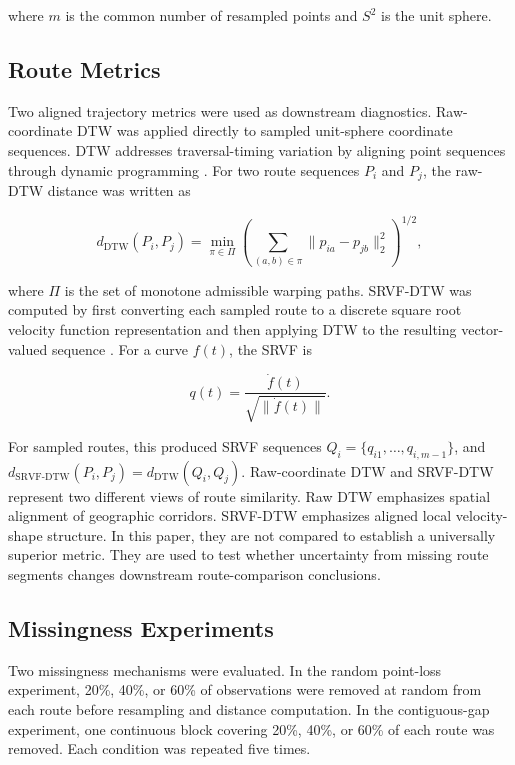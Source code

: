 where \(m\) is the common number of resampled points and \(S^2\) is the unit sphere.

\subsection{Route Metrics}\label{route-metrics}

Two aligned trajectory metrics were used as downstream diagnostics. Raw-coordinate DTW was applied directly to sampled unit-sphere coordinate sequences. DTW addresses traversal-timing variation by aligning point sequences through dynamic programming \citep{sakoe1978}. For two route sequences \(P_i\) and \(P_j\), the raw-DTW distance was written as

\[
d_{\mathrm{DTW}}(P_i,P_j)
= \min_{\pi \in \Pi}
\left(\sum_{(a,b)\in \pi} \lVert p_{ia}-p_{jb}\rVert_2^2\right)^{1/2},
\]

where \(\Pi\) is the set of monotone admissible warping paths. SRVF-DTW was computed by first converting each sampled route to a discrete square root velocity function representation and then applying DTW to the resulting vector-valued sequence \citep{srivastava2011}. For a curve \(f(t)\), the SRVF is

\[
q(t) = \frac{\dot f(t)}{\sqrt{\|\dot f(t)\|}}.
\]

For sampled routes, this produced SRVF sequences \(Q_i=\{q_{i1},\ldots,q_{i,m-1}\}\), and \(d_{\mathrm{SRVF\text{-}DTW}}(P_i,P_j)=d_{\mathrm{DTW}}(Q_i,Q_j)\). Raw-coordinate DTW and SRVF-DTW represent two different views of route similarity. Raw DTW emphasizes spatial alignment of geographic corridors. SRVF-DTW emphasizes aligned local velocity-shape structure. In this paper, they are not compared to establish a universally superior metric. They are used to test whether uncertainty from missing route segments changes downstream route-comparison conclusions.

\subsection{Missingness Experiments}\label{missingness-experiments}

Two missingness mechanisms were evaluated. In the random point-loss experiment, 20\%, 40\%, or 60\% of observations were removed at random from each route before resampling and distance computation. In the contiguous-gap experiment, one continuous block covering 20\%, 40\%, or 60\% of each route was removed. Each condition was repeated five times.

